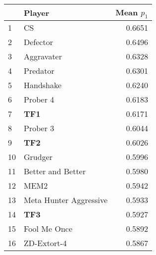 \begin{tabular}{llr}
\toprule
{} &                  Player &  Mean $p_1$ \\
\midrule
1  &                      CS &      0.6651 \\
2  &                Defector &      0.6496 \\
3  &              Aggravater &      0.6328 \\
4  &                Predator &      0.6301 \\
5  &               Handshake &      0.6240 \\
6  &                Prober 4 &      0.6183 \\
7  &                     \textbf{TF1} &      0.6171 \\
8  &                Prober 3 &      0.6044 \\
9  &                     \textbf{TF2} &      0.6026 \\
10 &                 Grudger &      0.5996 \\
11 &       Better and Better &      0.5980 \\
12 &                    MEM2 &      0.5942 \\
13 &  Meta Hunter Aggressive &      0.5933 \\
14 &                     \textbf{TF3} &      0.5927 \\
15 &            Fool Me Once &      0.5892 \\
16 &             ZD-Extort-4 &      0.5867 \\
\bottomrule
\end{tabular}
